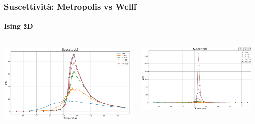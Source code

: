 \begin{frame}
    \frametitle{Suscettività: Metropolis vs Wolff}
    \framesubtitle{Ising 2D}

    \begin{columns}
        \begin{column}{0.5\textwidth}

            \centering
            \includegraphics[width=\textwidth]{Immagini/backupIsing2D/chi.png}

        \end{column}
    
        \begin{column}{0.5\textwidth}

            \centering
            \includegraphics[width=\textwidth]{Immagini/backupIsing2D/chi_w.png}
            
        \end{column}
    \end{columns}

\end{frame}




